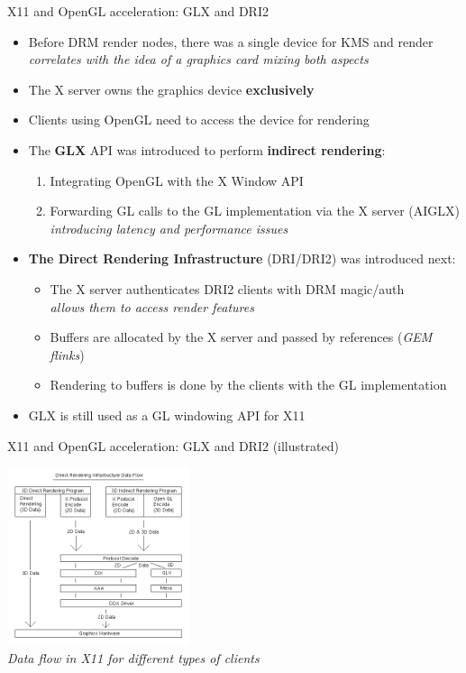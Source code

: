 \begin{frame}{X11 and OpenGL acceleration: GLX and DRI2}
  \begin{itemize}
  \item Before DRM render nodes, there was a single device for KMS and render\\
    \textit{correlates with the idea of a graphics card mixing both aspects}
  \item The X server owns the graphics device \textbf{exclusively}
  \item Clients using OpenGL need to access the device for rendering
  \item The \textbf{GLX} API was introduced to perform \textbf{indirect rendering}:
    \begin{enumerate}
    \item Integrating OpenGL with the X Window API
    \item Forwarding GL calls to the GL implementation via the X server (AIGLX)\\
      \textit{introducing latency and performance issues}
    \end{enumerate}
  \item \textbf{The Direct Rendering Infrastructure} (DRI/DRI2) was introduced next:
    \begin{itemize}
    \item The X server authenticates DRI2 clients with DRM magic/auth\\
      \textit{allows them to access render features}
    \item Buffers are allocated by the X server and passed by references (\textit{GEM flinks})
    \item Rendering to buffers is done by the clients with the GL implementation
    \end{itemize}
  \item GLX is still used as a GL windowing API for X11
  \end{itemize}
\end{frame}

\begin{frame}{X11 and OpenGL acceleration: GLX and DRI2 (illustrated)}
  \begin{center}
  \includegraphics[width=0.4\textwidth]{slides/graphics-software/dri-data-flow.png}\\
  \textit{Data flow in X11 for different types of clients}
  \end{center}
\end{frame}

